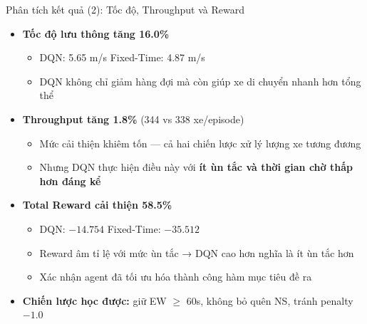 \begin{frame}{Phân tích kết quả (2): Tốc độ, Throughput và Reward}
\begin{itemize}
    \item \textbf{Tốc độ lưu thông tăng 16.0\%}
    \begin{itemize}
        \item DQN: 5.65 m/s \quad Fixed-Time: 4.87 m/s
        \item DQN không chỉ giảm hàng đợi mà còn giúp xe di chuyển nhanh hơn tổng thể
    \end{itemize}
    \item \textbf{Throughput tăng 1.8\%} (344 vs 338 xe/episode)
    \begin{itemize}
        \item Mức cải thiện khiêm tốn — cả hai chiến lược xử lý lượng xe tương đương
        \item Nhưng DQN thực hiện điều này với \textbf{ít ùn tắc và thời gian chờ thấp hơn đáng kể}
    \end{itemize}
    \item \textbf{Total Reward cải thiện 58.5\%}
    \begin{itemize}
        \item DQN: $-14.754$ \quad Fixed-Time: $-35.512$
        \item Reward âm tỉ lệ với mức ùn tắc → DQN cao hơn nghĩa là ít ùn tắc hơn
        \item Xác nhận agent đã tối ưu hóa thành công hàm mục tiêu đề ra
    \end{itemize}
    \item \textbf{Chiến lược học được:} giữ EW $\geq$ 60s, không bỏ quên NS, tránh penalty $-1.0$
\end{itemize}
\end{frame}

